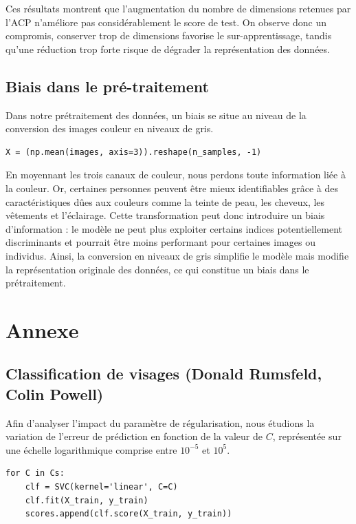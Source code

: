 \documentclass[a4paper,12pt]{article}
\begin{document}
Ces résultats montrent que l’augmentation du nombre de dimensions retenues par l’ACP n'améliore pas considérablement le score de test. On observe donc un compromis, conserver trop de dimensions favorise le sur-apprentissage, tandis qu’une réduction trop forte risque de dégrader la représentation des données.

\subsection{Biais dans le pré-traitement}

Dans notre prétraitement des données, un biais se situe au niveau de la conversion des images couleur en niveaux de gris.

\begin{verbatim}
X = (np.mean(images, axis=3)).reshape(n_samples, -1)
\end{verbatim}

En moyennant les trois canaux de couleur, nous perdons toute information liée à la couleur. Or, certaines personnes peuvent être mieux identifiables grâce à des caractéristiques dûes aux couleurs comme la teinte de peau, les cheveux, les vêtements et l'éclairage. Cette transformation peut donc introduire un biais d’information : le modèle ne peut plus exploiter certains indices potentiellement discriminants et pourrait être moins performant pour certaines images ou individus.
Ainsi, la conversion en niveaux de gris simplifie le modèle mais modifie la représentation originale des données, ce qui constitue un biais dans le prétraitement.

\section{Annexe}

\subsection{Classification de visages (Donald Rumsfeld, Colin Powell)}

Afin d’analyser l’impact du paramètre de régularisation, nous étudions la variation de l’erreur de prédiction en fonction de la valeur de $C$, représentée sur une échelle logarithmique comprise entre $10^{-5}$ et $10^{5}$.


\begin{verbatim}
for C in Cs:
    clf = SVC(kernel='linear', C=C)
    clf.fit(X_train, y_train)   
    scores.append(clf.score(X_train, y_train))
\end{verbatim}
\end{document}
